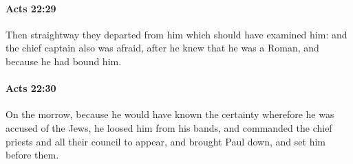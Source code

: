		\paragraph{Acts 22:29} %
			\label{ACTS-22-29}

			Then straightway they departed from him which should have examined him: and the chief captain also was afraid, after he knew that he was a Roman, and because he had bound him.

			\begin{framed}
			\scriptsize
				\begin{compactdesc}
					\item[SBLG] 
				\end{compactdesc}
			\end{framed}

		\paragraph{Acts 22:30} %
			\label{ACTS-22-30}

			On the morrow, because he would have known the certainty wherefore he was accused of the Jews, he loosed him from his bands, and commanded the chief priests and all their council to appear, and brought Paul down, and set him before them.

